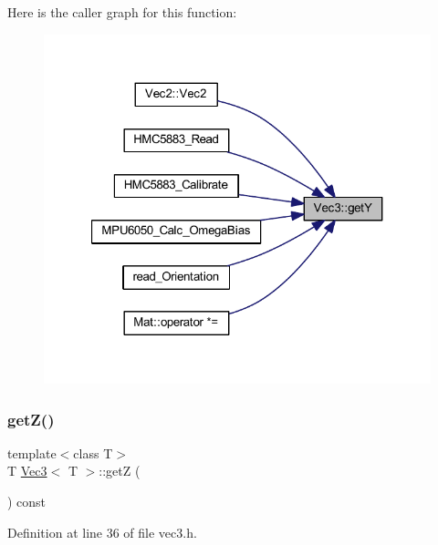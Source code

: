 Here is the caller graph for this function\+:
\nopagebreak
\begin{figure}[H]
\begin{center}
\leavevmode
\includegraphics[width=321pt]{class_vec3_a8eeb16262b7e619f081a1ba94df098f8_icgraph}
\end{center}
\end{figure}
\mbox{\label{class_vec3_a52f0db1c387aa9bc7befe5792b698553}} 
\subsubsection{\texorpdfstring{getZ()}{getZ()}}
{\footnotesize\ttfamily template$<$class T$>$ \\
T \mbox{\hyperlink{class_vec3}{Vec3}}$<$ T $>$\+::getZ (\begin{DoxyParamCaption}{ }\end{DoxyParamCaption}) const\hspace{0.3cm}{\ttfamily [inline]}}



Definition at line 36 of file vec3.\+h.

